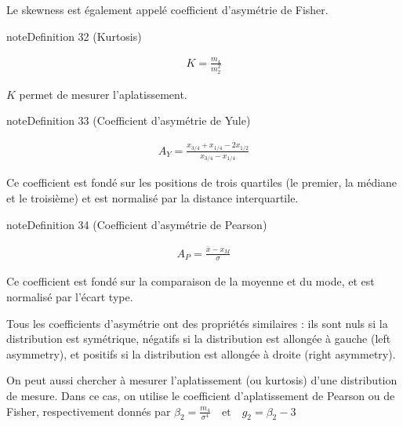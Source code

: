 \documentclass[letterpaper,10pt,english]{jupyterBook}
\begin{document}
\sphinxAtStartPar
Le skewness est également appelé coefficient d’asymétrie de Fisher.
\label{statsdescriptives:definition-16}
\begin{sphinxadmonition}{note}{Definition 32 (Kurtosis)}


\begin{equation*}
\begin{split}K=\frac{m_4}{m_2^2}\end{split}
\end{equation*}\end{sphinxadmonition}

\sphinxAtStartPar
\(K\) permet de mesurer l’aplatissement.
\label{statsdescriptives:definition-17}
\begin{sphinxadmonition}{note}{Definition 33 (Coefficient d’asymétrie de Yule)}


\begin{equation*}
\begin{split}A_Y = \frac{x_{3/4}+x_{1/4}-2x_{1/2}}{x_{3/4}-x_{1/4}}\end{split}
\end{equation*}\end{sphinxadmonition}

\sphinxAtStartPar
Ce coefficient est fondé sur les positions de trois quartiles (le premier, la médiane et le troisième) et est normalisé par la distance interquartile.
\label{statsdescriptives:definition-18}
\begin{sphinxadmonition}{note}{Definition 34 (Coefficient d’asymétrie de Pearson)}


\begin{equation*}
\begin{split}A_P = \frac{\bar{x}-x_M}{\sigma}\end{split}
\end{equation*}\end{sphinxadmonition}

\sphinxAtStartPar
Ce coefficient est fondé sur la comparaison de la moyenne et du mode, et est normalisé par l’écart type.

\sphinxAtStartPar
Tous les coefficients d’asymétrie ont des propriétés similaires : ils sont nuls si la distribution est symétrique, négatifs si la distribution est allongée à gauche (left asymmetry), et positifs si la distribution est allongée à droite (right asymmetry).

\sphinxAtStartPar
On peut aussi chercher à mesurer l’aplatissement (ou kurtosis) d’une distribution de mesure. Dans ce cas, on utilise le coefficient d’aplatissement de Pearson ou de Fisher, respectivement donnés par
\(\beta_2=\frac{m_4}{\sigma^4}\quad\textrm{et}\quad g_2=\beta_2-3\)
\end{document}
